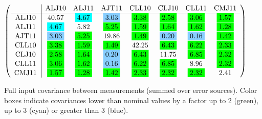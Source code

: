 \begin{table}[H]
\scriptsize
\begin{center}
\renewcommand{\arraystretch}{1.1}
\begin{math}\left(\begin{array}{c|ccccccc}
 & \mathrm{ALJ10} & 
\mathrm{ALJ11} & 
\mathrm{AJT11} & 
\mathrm{CLL10} & 
\mathrm{CLJ10} & 
\mathrm{CLL11} & 
\mathrm{CMJ11} \\
\hline
\mathrm{ALJ10} \hspace*{2pt} &      40.57 &  \colorbox{Cyan1}{$      4.67$} &  \colorbox{SkyBlue1}{$      3.03$} &  \colorbox{Green1}{$      3.38$} &  \colorbox{Green1}{$      2.58$} &  \colorbox{Green1}{$      3.06$} &  \colorbox{Green1}{$      1.57$} \\
\mathrm{ALJ11} \hspace*{2pt} &  \colorbox{Cyan1}{$      4.67$} &       5.82 &  \colorbox{Green1}{$      5.25$} &  \colorbox{Green1}{$      1.59$} &  \colorbox{Green1}{$      1.64$} &  \colorbox{Green1}{$      1.62$} &  \colorbox{Green1}{$      1.28$} \\
\mathrm{AJT11} \hspace*{2pt} &  \colorbox{SkyBlue1}{$      3.03$} &  \colorbox{Green1}{$      5.25$} &      19.86 &  \colorbox{Green1}{$      1.49$} &  \colorbox{SkyBlue1}{$      0.20$} &  \colorbox{SkyBlue1}{$      0.16$} &  \colorbox{Green1}{$      1.42$} \\
\mathrm{CLL10} \hspace*{2pt} &  \colorbox{Green1}{$      3.38$} &  \colorbox{Green1}{$      1.59$} &  \colorbox{Green1}{$      1.49$} &      42.25 &  \colorbox{Green1}{$      6.43$} &  \colorbox{Green1}{$      6.22$} &  \colorbox{Green1}{$      2.33$} \\
\mathrm{CLJ10} \hspace*{2pt} &  \colorbox{Green1}{$      2.58$} &  \colorbox{Green1}{$      1.64$} &  \colorbox{SkyBlue1}{$      0.20$} &  \colorbox{Green1}{$      6.43$} &      11.75 &  \colorbox{Green1}{$      6.85$} &  \colorbox{Green1}{$      2.32$} \\
\mathrm{CLL11} \hspace*{2pt} &  \colorbox{Green1}{$      3.06$} &  \colorbox{Green1}{$      1.62$} &  \colorbox{SkyBlue1}{$      0.16$} &  \colorbox{Green1}{$      6.22$} &  \colorbox{Green1}{$      6.85$} &       8.96 &  \colorbox{Green1}{$      2.32$} \\
\mathrm{CMJ11} \hspace*{2pt} &  \colorbox{Green1}{$      1.57$} &  \colorbox{Green1}{$      1.28$} &  \colorbox{Green1}{$      1.42$} &  \colorbox{Green1}{$      2.33$} &  \colorbox{Green1}{$      2.32$} &  \colorbox{Green1}{$      2.32$} &       2.41 \\
\end{array}\right)\end{math}
\caption{Full input covariance between measurements (summed over error sources). Color boxes indicate covariances lower than nominal values by a factor up to 2 (green), up to 3 (cyan) or greater than 3 (blue).}
\renewcommand{\arraystretch}{1}
\end{center}
\end{table}
